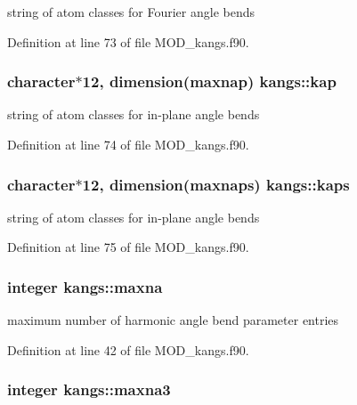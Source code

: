 string of atom classes for Fourier angle bends 



Definition at line 73 of file M\-O\-D\-\_\-kangs.\-f90.

\hypertarget{classkangs_ac7bbbd307bb29d3b700975bdb4be82f8}{
\subsubsection[{kap}]{\setlength{\rightskip}{0pt plus 5cm}character$\ast$12, dimension({\bf maxnap}) kangs\-::kap}}\label{classkangs_ac7bbbd307bb29d3b700975bdb4be82f8}


string of atom classes for in-\/plane angle bends 



Definition at line 74 of file M\-O\-D\-\_\-kangs.\-f90.

\hypertarget{classkangs_a38e37031d21fcaad9c9d41214393bb4b}{
\subsubsection[{kaps}]{\setlength{\rightskip}{0pt plus 5cm}character$\ast$12, dimension({\bf maxnaps}) kangs\-::kaps}}\label{classkangs_a38e37031d21fcaad9c9d41214393bb4b}


string of atom classes for in-\/plane angle bends 



Definition at line 75 of file M\-O\-D\-\_\-kangs.\-f90.

\hypertarget{classkangs_a219b9491df85352c42fb06b082f1fce2}{
\subsubsection[{maxna}]{\setlength{\rightskip}{0pt plus 5cm}integer kangs\-::maxna}}\label{classkangs_a219b9491df85352c42fb06b082f1fce2}


maximum number of harmonic angle bend parameter entries 



Definition at line 42 of file M\-O\-D\-\_\-kangs.\-f90.

\hypertarget{classkangs_a121c0c19e92533f59e8c9b276e200da5}{
\subsubsection[{maxna3}]{\setlength{\rightskip}{0pt plus 5cm}integer kangs\-::maxna3}}\label{classkangs_a121c0c19e92533f59e8c9b276e200da5}


